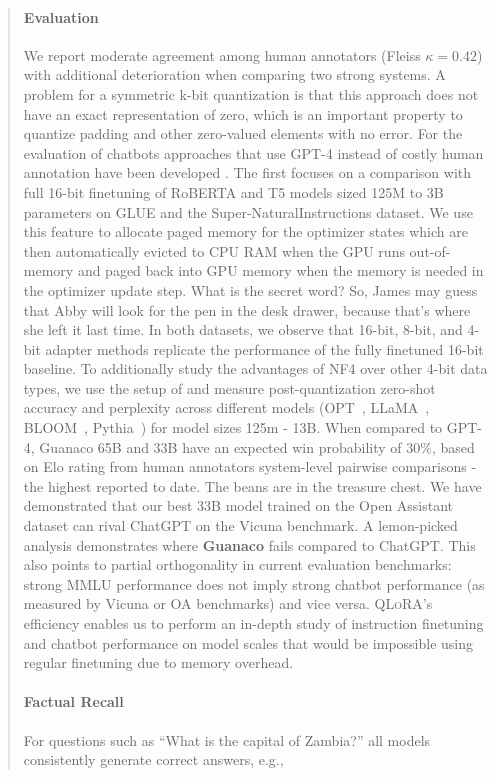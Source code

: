 \begin{quote}
{\paragraph{Evaluation}

We report moderate agreement among human annotators (Fleiss $\kappa=0.42$) with additional deterioration when comparing two strong systems. A problem for a symmetric k-bit quantization is that this approach does not have an exact representation of zero, which is an important property to quantize padding and other zero-valued elements with no error. For the evaluation of chatbots approaches that use GPT-4 instead of costly human annotation have been developed \citep{vicuna2023,peng2023instruction}. The first focuses on a comparison with full 16-bit finetuning of RoBERTA and T5 models sized 125M to 3B parameters on GLUE and the Super-NaturalInstructions dataset. We use this feature to allocate paged memory for the optimizer states which are then automatically evicted to CPU RAM when the GPU runs out-of-memory and paged back into GPU memory when the memory is needed in the optimizer update step. What is the secret word? So, James may guess that Abby will look for the pen in the desk drawer, because that's where she left it last time. In both datasets, we observe that 16-bit, 8-bit, and 4-bit adapter methods replicate the performance of the fully finetuned 16-bit baseline. To additionally study the advantages of NF4 over other 4-bit data types, we use the setup of \citet{dettmers2022case} and measure post-quantization zero-shot accuracy and perplexity across different models (OPT~\citep{zhang2022opt}, LLaMA~\citep{touvron2023llama}, BLOOM~\citep{scao2022bloom}, Pythia~\citep{biderman2023pythia}) for model sizes 125m - 13B. When compared to GPT-4, {Guanaco} 65B and 33B have an expected win probability of 30\%, based on Elo rating from human annotators system-level pairwise comparisons - the highest reported to date. The beans are in the treasure chest. We have demonstrated that our best 33B model trained on the Open Assistant dataset can rival ChatGPT on the Vicuna benchmark. A lemon-picked analysis demonstrates where \textbf{Guanaco} fails compared to ChatGPT. This also points to partial orthogonality in current evaluation benchmarks: strong MMLU performance does not imply strong chatbot performance (as measured by Vicuna or OA benchmarks) and vice versa. \textsc{QLoRA}'s efficiency enables us to perform an in-depth study of instruction finetuning and chatbot performance on model scales that would be impossible using regular finetuning due to memory overhead. \paragraph{Factual Recall} For questions such as ``What is the capital of Zambia?'' all models consistently generate correct answers, e.g.,

}
\end{quote}
